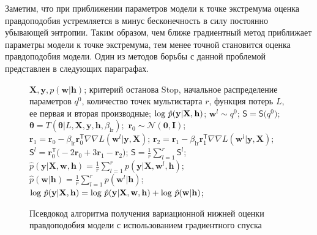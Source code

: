 Заметим, что при приближении параметров модели к точке экстремума оценка правдоподобия устремляется в минус бесконечность в силу постоянно убывающей энтропии. Таким образом, чем ближе градиентный метод приближает параметры модели к точке экстремума, тем менее точной становится оценка правдоподобия модели. Один из методов борьбы с данной проблемой представлен в следующих параграфах.
\begin{figure}
\begin{algorithmic}[1]
\REQUIRE $\mathbf{X}, \mathbf{y}, p(\mathbf{w}|\mathbf{h})$;
\REQUIRE критерий останова $\text{Stop}$, начальное распределение параметров $q^0$, количество точек мультистарта $r$, функция потерь $L$, ее первая и вторая производные;
\ENSURE $\textnormal{log}~\hat{p}(\mathbf{y}|\mathbf{X}, \mathbf{h})$;
\STATE $\mathbf{w}^l \sim q^0$;
\ENDFOR
\STATE $\mathsf{S} = \mathsf{S}\bigl(q^0)$;
\STATE $\boldsymbol{\theta} = T( \boldsymbol{\theta}| L,\mathbf{X},  \mathbf{y},  \mathbf{h}, {\beta_{\text{lr}}});$
\STATE $\mathbf{r}_0 \sim \mathcal{N}(\mathbf{0}, \mathbf{I})$;
\STATE $\mathbf{r}_1 = \mathbf{r}_0 - \beta_{\text{lr}} \mathbf{r}^{\mathsf{T}}_0 \nabla \nabla L(\mathbf{w}^l| \mathbf{y}, \mathbf{X})$;
\STATE $\mathbf{r}_2 = \mathbf{r}_1 - \beta_{\text{lr}} \mathbf{r}^{\mathsf{T}}_1 \nabla \nabla L(\mathbf{w}^l| \mathbf{y}, \mathbf{X})$;
\STATE $\mathsf{S}^l = \mathbf{r}_0^\mathsf{T}\bigl(-2\mathbf{r}_0 + 3\mathbf{r}_1 -\mathbf{r}_2\bigr)$;
\ENDFOR
\STATE $\mathsf{S} = \frac{1}{r}\sum_{l=1}^r \mathsf{S}^l$;
\ENDWHILE
\STATE $\hat{p}(\mathbf{y}|\mathbf{X}, \mathbf{w}, \mathbf{h}) = \frac{1}{r}\sum_{l=1}^r p(\mathbf{y}|\mathbf{X}, \mathbf{w}^l, \mathbf{h})$;
\STATE $\hat{p}(\mathbf{w} | \mathbf{h}) = \frac{1}{r}\sum_{l=1}^r p(\mathbf{w}^l| \mathbf{h})$;
\STATE $\textnormal{log}~\hat{p}(\mathbf{y}|\mathbf{X}, \mathbf{h}) = \textnormal{log}~\hat{p}(\mathbf{y}|\mathbf{X}, \mathbf{w}, \mathbf{h}) +\textnormal{log}~\hat{p}(\mathbf{w} | \mathbf{h})$;
	
\end{algorithmic}
\caption{Псевдокод алгоритма получения вариационной нижней оценки правдоподобия модели с использованием градиентного спуска}
\label{fig:algo}

\end{figure}



